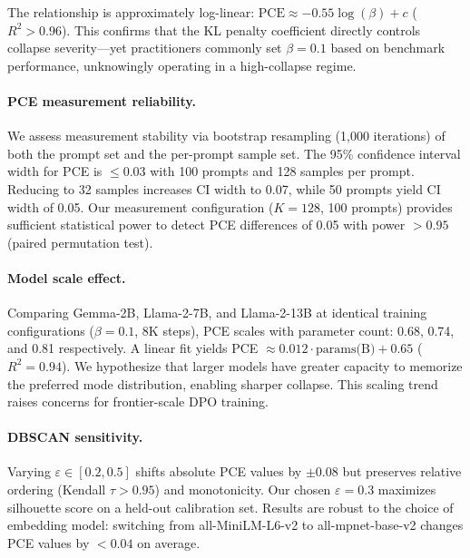 The relationship is approximately log-linear: $\text{PCE} \approx -0.55 \log(\beta) + c$ ($R^2 > 0.96$). This confirms that the KL penalty coefficient directly controls collapse severity---yet practitioners commonly set $\beta = 0.1$ based on benchmark performance, unknowingly operating in a high-collapse regime.

\paragraph{PCE measurement reliability.} We assess measurement stability via bootstrap resampling (1{,}000 iterations) of both the prompt set and the per-prompt sample set. The 95\% confidence interval width for PCE is $\leq 0.03$ with 100 prompts and 128 samples per prompt. Reducing to 32 samples increases CI width to 0.07, while 50 prompts yield CI width of 0.05. Our measurement configuration ($K = 128$, 100 prompts) provides sufficient statistical power to detect PCE differences of 0.05 with power $> 0.95$ (paired permutation test).

\paragraph{Model scale effect.} Comparing Gemma-2B, Llama-2-7B, and Llama-2-13B at identical training configurations ($\beta = 0.1$, 8K steps), PCE scales with parameter count: 0.68, 0.74, and 0.81 respectively. A linear fit yields PCE $\approx 0.012 \cdot \text{params(B)} + 0.65$ ($R^2 = 0.94$). We hypothesize that larger models have greater capacity to memorize the preferred mode distribution, enabling sharper collapse. This scaling trend raises concerns for frontier-scale DPO training.

\paragraph{DBSCAN sensitivity.} Varying $\varepsilon \in [0.2, 0.5]$ shifts absolute PCE values by $\pm 0.08$ but preserves relative ordering (Kendall $\tau > 0.95$) and monotonicity. Our chosen $\varepsilon = 0.3$ maximizes silhouette score on a held-out calibration set. Results are robust to the choice of embedding model: switching from all-MiniLM-L6-v2 to all-mpnet-base-v2 changes PCE values by $< 0.04$ on average.

